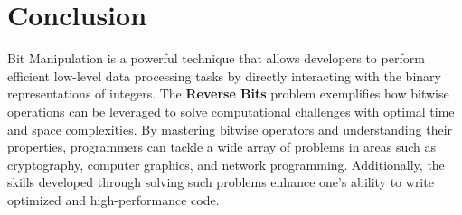 \section*{Conclusion}

Bit Manipulation is a powerful technique that allows developers to perform efficient low-level data processing tasks by directly interacting with the binary representations of integers. The \textbf{Reverse Bits} problem exemplifies how bitwise operations can be leveraged to solve computational challenges with optimal time and space complexities. By mastering bitwise operators and understanding their properties, programmers can tackle a wide array of problems in areas such as cryptography, computer graphics, and network programming. Additionally, the skills developed through solving such problems enhance one's ability to write optimized and high-performance code.

\printindex

% 
% 
% 
% 
% 
% 
% 
% 